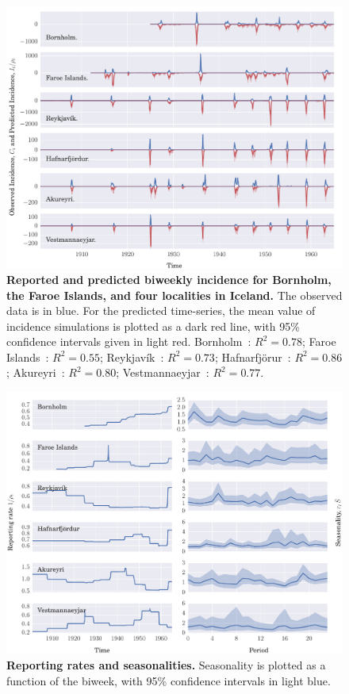 \documentclass[10pt]{article}
\begin{document}
\begin{figure}[!h]
\centering
\includegraphics[width=\textwidth]{figures/q1.pdf}
\caption{\textbf{Reported and predicted biweekly incidence for Bornholm, the Faroe Islands, and four localities in Iceland.} The observed data is in blue. For the predicted time-series, the mean value of incidence simulations is plotted as a dark red line, with 95\% confidence intervals given in light red. Bornholm~: $R^2=0.78$; Faroe Islands~: $R^2=0.55$; Reykjav\'{i}k~: $R^2=0.73$; Hafnarfj\"{o}r\dh{}ur~: $R^2=0.86$; Akureyri~: $R^2=0.80$; Vestmannaeyjar~: $R^2=0.77$.}
\label{figIncidence}
\end{figure}



\begin{figure}[!h]
\centering
\includegraphics[width=\textwidth]{figures/q2.pdf}
\caption{\textbf{Reporting rates and seasonalities.} Seasonality is plotted as a function of the biweek, with 95\% confidence intervals in light blue.}
\label{figSims}
\end{figure}
\end{document}
